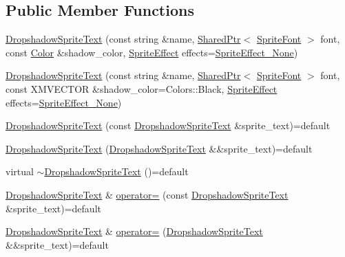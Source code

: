 \subsection*{Public Member Functions}
\begin{DoxyCompactItemize}
\item 
\hyperlink{classmage_1_1_dropshadow_sprite_text_a10b134e06d6bcf04168005630a2934f0}{Dropshadow\+Sprite\+Text} (const string \&name, \hyperlink{namespacemage_a1e01ae66713838a7a67d30e44c67703e}{Shared\+Ptr}$<$ \hyperlink{classmage_1_1_sprite_font}{Sprite\+Font} $>$ font, const \hyperlink{structmage_1_1_color}{Color} \&shadow\+\_\+color, \hyperlink{namespacemage_a9cfe18123066ba4236f548f9de75d881}{Sprite\+Effect} effects=\hyperlink{namespacemage_a9cfe18123066ba4236f548f9de75d881af3c275fbfacfe174da928b2f24dfa515}{Sprite\+Effect\+\_\+\+None})
\item 
\hyperlink{classmage_1_1_dropshadow_sprite_text_aad4f7653cdc925c12cfc3a4915552efb}{Dropshadow\+Sprite\+Text} (const string \&name, \hyperlink{namespacemage_a1e01ae66713838a7a67d30e44c67703e}{Shared\+Ptr}$<$ \hyperlink{classmage_1_1_sprite_font}{Sprite\+Font} $>$ font, const X\+M\+V\+E\+C\+T\+OR \&shadow\+\_\+color=Colors\+::\+Black, \hyperlink{namespacemage_a9cfe18123066ba4236f548f9de75d881}{Sprite\+Effect} effects=\hyperlink{namespacemage_a9cfe18123066ba4236f548f9de75d881af3c275fbfacfe174da928b2f24dfa515}{Sprite\+Effect\+\_\+\+None})
\item 
\hyperlink{classmage_1_1_dropshadow_sprite_text_a3d6c78caf74d6b8b0928934e08be0fe6}{Dropshadow\+Sprite\+Text} (const \hyperlink{classmage_1_1_dropshadow_sprite_text}{Dropshadow\+Sprite\+Text} \&sprite\+\_\+text)=default
\item 
\hyperlink{classmage_1_1_dropshadow_sprite_text_a23154e6e6be44142b656df65d11418e6}{Dropshadow\+Sprite\+Text} (\hyperlink{classmage_1_1_dropshadow_sprite_text}{Dropshadow\+Sprite\+Text} \&\&sprite\+\_\+text)=default
\item 
virtual \hyperlink{classmage_1_1_dropshadow_sprite_text_a06edb2d048974849c48c7a91ef244a2c}{$\sim$\+Dropshadow\+Sprite\+Text} ()=default
\item 
\hyperlink{classmage_1_1_dropshadow_sprite_text}{Dropshadow\+Sprite\+Text} \& \hyperlink{classmage_1_1_dropshadow_sprite_text_acc96ceb07c46894d731e86b735d3b594}{operator=} (const \hyperlink{classmage_1_1_dropshadow_sprite_text}{Dropshadow\+Sprite\+Text} \&sprite\+\_\+text)=default
\item 
\hyperlink{classmage_1_1_dropshadow_sprite_text}{Dropshadow\+Sprite\+Text} \& \hyperlink{classmage_1_1_dropshadow_sprite_text_a8f2ff9363c2710d03c87d45de6ccabc0}{operator=} (\hyperlink{classmage_1_1_dropshadow_sprite_text}{Dropshadow\+Sprite\+Text} \&\&sprite\+\_\+text)=default

\end{DoxyCompactItemize}
